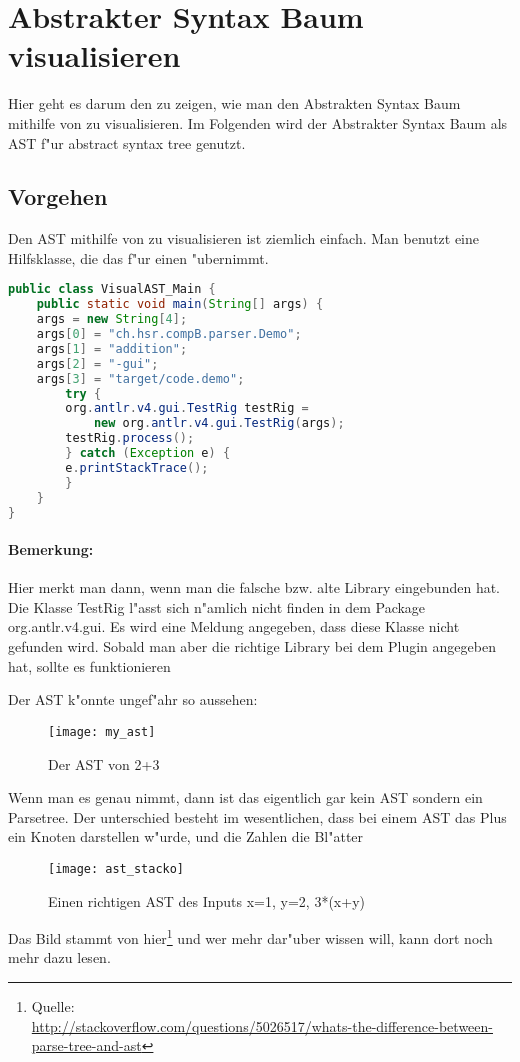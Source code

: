 
\section{Abstrakter Syntax Baum visualisieren}
\label{sec:visualizeAST}
Hier geht es darum den zu zeigen, wie man den Abstrakten Syntax Baum mithilfe von \antlr zu visualisieren. Im Folgenden wird der Abstrakter Syntax Baum als AST f"ur abstract syntax tree genutzt. 

\subsection{Vorgehen}
Den AST mithilfe von \antlr zu visualisieren ist ziemlich einfach. Man benutzt eine Hilfsklasse, die das f"ur einen "ubernimmt. 

\begin{lstlisting}[language=Java]
public class VisualAST_Main {
    public static void main(String[] args) {
	args = new String[4];
	args[0] = "ch.hsr.compB.parser.Demo";
	args[1] = "addition";
	args[2] = "-gui";
	args[3] = "target/code.demo";
	    try {
		org.antlr.v4.gui.TestRig testRig = 
		    new org.antlr.v4.gui.TestRig(args); 
		testRig.process();
	    } catch (Exception e) {
		e.printStackTrace();
	    }
    }
}
\end{lstlisting}

\paragraph{Bemerkung:}
Hier merkt man dann, wenn man die falsche bzw. alte \antlr Library eingebunden hat. Die Klasse TestRig l"asst sich n"amlich nicht finden in dem Package org.antlr.v4.gui. Es wird eine Meldung angegeben, dass diese Klasse nicht gefunden wird. Sobald man aber die richtige Library bei dem Plugin angegeben hat, sollte es funktionieren

Der AST k"onnte ungef"ahr so aussehen:

\begin{figure}[H]
	\centering
	\texttt{[image: my\_ast]}
	\caption{Der AST von 2+3}
\end{figure}

Wenn man es genau nimmt, dann ist das eigentlich gar kein AST sondern ein Parsetree. Der unterschied besteht im wesentlichen, dass bei einem AST das Plus ein Knoten darstellen w"urde, und die Zahlen die Bl"atter

\begin{figure}[H]
	\centering
	\texttt{[image: ast\_stacko]}
	\caption{Einen richtigen AST des Inputs x=1, y=2, 3*(x+y)}
\end{figure}

Das Bild stammt von hier\footnote{Quelle:\\ \url{http://stackoverflow.com/questions/5026517/whats-the-difference-between-parse-tree-and-ast}} und wer mehr dar"uber wissen will, kann dort noch mehr dazu lesen.